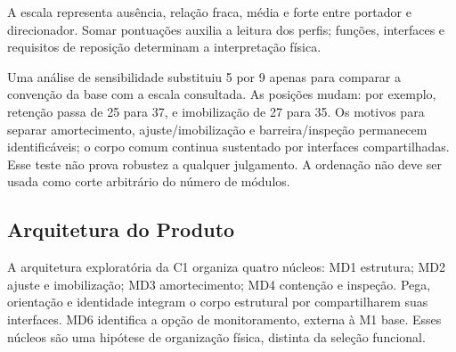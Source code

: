 A escala representa ausência, relação fraca, média e forte entre portador e direcionador. Somar pontuações auxilia a leitura dos perfis; funções, interfaces e requisitos de reposição determinam a interpretação física.

Uma análise de sensibilidade substituiu 5 por 9 apenas para comparar a convenção da base com a escala consultada. As posições mudam: por exemplo, retenção passa de 25 para 37, e imobilização de 27 para 35. Os motivos para separar amortecimento, ajuste/imobilização e barreira/inspeção permanecem identificáveis; o corpo comum continua sustentado por interfaces compartilhadas. Esse teste não prova robustez a qualquer julgamento. A ordenação não deve ser usada como corte arbitrário do número de módulos.

\subsection{Arquitetura do Produto}
\label{sec:arquitetura-mim}

A arquitetura exploratória da C1 organiza quatro núcleos: MD1 estrutura; MD2 ajuste e imobilização; MD3 amortecimento; MD4 contenção e inspeção. Pega, orientação e identidade integram o corpo estrutural por compartilharem suas interfaces. MD6 identifica a opção de monitoramento, externa à M1 base. Esses núcleos são uma hipótese de organização física, distinta da seleção funcional.

